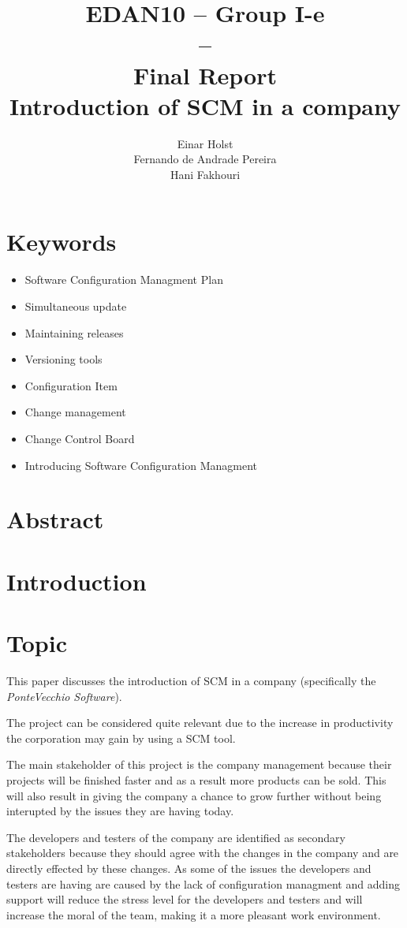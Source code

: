\documentclass[a4paper]{article}
\title{EDAN10 -- Group I-e\\--\\ Final Report \\
Introduction of SCM in a company 
}
\author{Einar Holst \\
Fernando de Andrade Pereira \\
Hani Fakhouri
}
\begin{document}
\maketitle
\thispagestyle{empty}
\clearpage

\tableofcontents
\thispagestyle{empty}
\clearpage

\setcounter{page}{1}

\section{Keywords}
\begin{itemize}
\item Software Configuration Managment Plan
\item Simultaneous update
\item Maintaining releases
\item Versioning tools
\item Configuration Item
\item Change management
\item Change Control Board
\item Introducing Software Configuration Managment
\end{itemize}

\section{Abstract}

\section{Introduction}


\section{Topic}
This paper discusses the introduction of SCM in a company (specifically the \emph{PonteVecchio Software}).

The project can be considered quite relevant due to the increase in productivity the corporation may gain by using a SCM tool.

The main stakeholder of this project is the company management because their projects will be finished faster and as a result more products can be sold. This will also result in giving the company a chance to grow further without being interupted by the issues they are having today.

The developers and testers of the company are identified as secondary stakeholders because they should agree with the changes in the company and are directly effected by these changes. As some of the issues the developers and testers are having are caused by the lack of configuration managment and adding support will reduce the stress level for the developers and testers and will increase the moral of the team, making it a more pleasant work environment.
\end{document}
